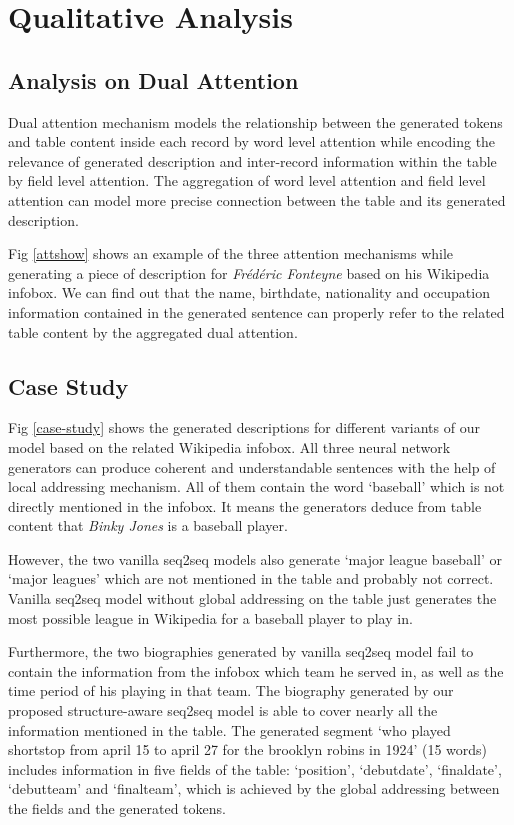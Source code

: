 \documentclass[letterpaper]{article} \usepackage{aaai18}  \usepackage{times}  \usepackage{helvet}  \usepackage{courier}  \usepackage{url}  \usepackage{graphicx}  \frenchspacing  \setlength{\pdfpagewidth}{8.5in}  \setlength{\pdfpageheight}{11in}  \usepackage{amsmath}
\begin{document}
\section{Qualitative Analysis}
\subsection{Analysis on Dual Attention}
Dual attention mechanism models the relationship between the generated tokens and table content inside each record by word level attention while encoding the relevance of generated description and inter-record information within the table by field level attention.
The aggregation of word level attention and field level attention can  model more precise connection between the table and its generated description. 

Fig \ref{attshow} shows an example of the three attention mechanisms while generating a piece of description for \textit{Fr\'ed\'eric Fonteyne} based on his Wikipedia infobox.
We can find out that the name, birthdate, nationality and occupation information contained in the generated sentence can properly refer to the related table content by the aggregated dual attention.

\subsection{Case Study}
Fig \ref{case-study} shows the generated descriptions for different variants of our model based on the related Wikipedia infobox. 
All three neural network generators can produce coherent and understandable sentences with the help of local addressing mechanism. All of them contain the word `baseball' which is not directly mentioned in the infobox. 
It means the generators deduce from table content that \textit{Binky Jones} is a baseball player.

However, the two vanilla seq2seq models also generate `major league baseball' or `major leagues' which are not mentioned in the table and probably not correct. Vanilla seq2seq model without global addressing on the table just generates the most possible league in Wikipedia for a baseball player to play in. 

Furthermore, the two biographies generated by vanilla seq2seq model fail to contain the information from the infobox which team he served in, as well as the time period of his playing in that team.
The biography generated by our proposed structure-aware seq2seq model is able to cover nearly all the information mentioned in the table. The generated segment `who played shortstop from april 15 to april 27 for the brooklyn robins in 1924' (15 words) includes information in five fields of the table: `position', `debutdate', `finaldate', `debutteam' and `finalteam', which is achieved by the global addressing between the fields and the generated tokens.
\end{document}
